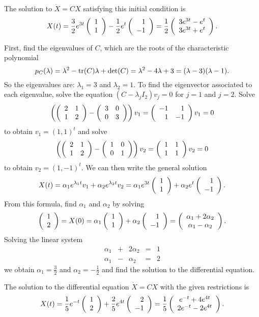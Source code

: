 \newpage
{} \ans The solution to $\dot{X} = CX$ satisfying this
initial condition is
\[
X(t) = \frac{3}{2}e^{3t}\left(\begin{array}{r} 1 \\ 1\end{array}\right) - \frac{1}{2}e^t\left(\begin{array}{r} 1 \\ -1\end{array}\right)
= \frac{1}{2}\left(\begin{array}{c} 3e^{3t} - e^t \\ 3e^{3t} + e^t\end{array}\right).
\]

\soln First, find the eigenvalues of $C$, which are the roots of the
characteristic polynomial
\[
p_C(\lambda) = \lambda^2 - {\rm tr}(C)\lambda + \det(C) =
\lambda^2 - 4\lambda + 3 = (\lambda - 3)(\lambda - 1).
\]
So the eigenvalues are: $\lambda_1 = 3$ and $\lambda_2 = 1$.
To find the eigenvector associated to each eigenvalue, solve
the equation $(C - \lambda_jI_2)v_j = 0$ for $j = 1$ and $j = 2$.  Solve
\[
\left(\left(\begin{array}{rr} 2 & 1\\ 1 &2\end{array}\right) - \left(\begin{array}{rr} 3 & 0\\ 0 &3\end{array}\right)\right)v_1 =
\left(\begin{array}{rr} -1 & 1\\ 1 &-1\end{array}\right)v_1 = 0
\]
to obtain $v_1 = (1,1)^t$ and solve
\[
\left(\left(\begin{array}{rr} 2 & 1\\ 1 &2\end{array}\right) - \left(\begin{array}{rr} 1 & 0\\ 0 &1\end{array}\right)\right)v_2 =
\left(\begin{array}{rr} 1 & 1\\ 1 &1\end{array}\right)v_2 = 0
\]
to obtain $v_2 = (1,-1)^t$.  We can then write the general solution
\[
X(t) = \alpha_1e^{\lambda_1 t}v_1 + \alpha_2e^{\lambda_2 t}v_2
= \alpha_1e^{3t}\left(\begin{array}{r} 1 \\ 1\end{array}\right) + \alpha_2e^t\left(\begin{array}{r} 1 \\ -1\end{array}\right).
\]
From this formula, find $\alpha_1$ and $\alpha_2$ by solving
\[
\left(\begin{array}{r} 1 \\ 2\end{array}\right) = X(0) = \alpha_1\left(\begin{array}{r} 1 \\ 1\end{array}\right) + \alpha_2\left(\begin{array}{r} 1 \\ -1\end{array}\right) =
\left(\begin{array}{c} \alpha_1 + 2\alpha_2 \\ \alpha_1 - \alpha_2\end{array}\right).
\]
Solving the linear system
\[
\begin{array}{rrrrr}
\alpha_1 & + & 2\alpha_2 & = & 1 \\
\alpha_1 & - & \alpha_2 & = & 2
\end{array}
\]
we obtain $\alpha_1 = \frac{3}{2}$ and $\alpha_2 = -\frac{1}{2}$
and find the solution to the differential equation.

 \ans The solution to the differential equation $\dot{X} =
CX$ with the given restrictions is
\[
X(t) = \frac{1}{5}e^{-t}\left(\begin{array}{r} 1 \\ 2\end{array}\right) + \frac{2}{5}e^{4t}\left(\begin{array}{r} 2 \\ -1\end{array}\right)
= \frac{1}{5}\left(\begin{array}{c} e^{-t} + 4e^{4t} \\ 2e^{-t} - 2e^{4t}\end{array}\right).
\]

